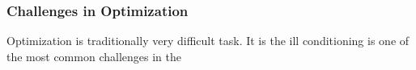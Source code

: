 \subsubsection{Challenges in Optimization}

Optimization is traditionally very difficult task. It is 
the ill conditioning is one of the most common challenges in the 